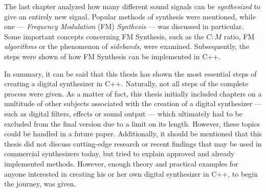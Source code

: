 The last chapter analyzed how many different sound signals can be \emph{synthesized} to give an entirely new signal. Popular methods of synthesis were mentioned, while one --- \emph{Frequency Modulation} (FM) \emph{Synthesis} --- was discussed in particular. Some important concepts concerning FM Synthesis, such as the $C:M$ ratio, FM \emph{algorithms} or the phenomenon of \emph{sidebands}, were examined. Subsequently, the steps were shown of how FM Synthesis can be implemented in C++. \parbreak

\pagebreak

In summary, it can be said that this thesis has shown the most essential steps of creating a digital synthesizer in C++. Naturally, not all steps of the complete process were given. As a matter of fact, this thesis initially included chapters on a multitude of other subjects associated with the creation of a digital synthesizer --- such as digital filters, effects or sound output --- which ultimately had to be excluded from the final version due to a limit on its length. However, these topics could be handled in a future paper. Additionally, it should be mentioned that this thesis did not discuss cutting-edge research or recent findings that may be used in commercial synthesizers today, but tried to explain approved and already implemented methods. However, enough theory and practical examples for anyone interested in creating his or her own digital synthesizer in C++, to begin the journey, was given.
